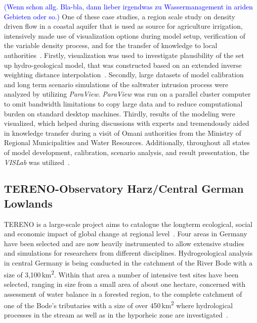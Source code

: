 \documentclass[twocolumn]{svjour3}          %
\newcommand{\myedit}[2]{\textcolor{red}{\st{#1}} \textcolor{blue}{#2}}
\begin{document}
\myedit{}{(Wenn schon allg. Bla-bla, dann lieber irgendwas zu Wassermanagement in ariden Gebieten oder so.)} One of these case studies, a region scale study on density driven flow in a coastal aquifer that is used as source for agriculture irrigation, intensively made use of visualization options during model setup, verification of the variable density process, and for the transfer of knowledge to local authorities~\cite{walther:cam, walther:eesenvirvis}. Firstly, visualization was used to investigate plausibility of the set up hydro-geological model, that was constructed based on an extended inverse weighting distance interpolation~\cite{walther:modelcare}. Secondly, large datasets of model calibration and long term scenario simulations of the saltwater intrusion process were analyzed by utilizing \emph{ParaView}. \emph{ParaView} was run on a parallel cluster computer to omit bandwidth limitations to copy large data and to reduce computational burden on standard desktop machines. Thirdly, results of the modeling were visualized, which helped during discussions with experts and tremendously aided in knowledge transfer during a visit of Omani authorities from the Ministry of Regional Municipalities and Water Resources. Additionally, throughout all states of model development, calibration, scenario analysis, and result presentation, the \emph{VISLab} was utilized~\cite{walther:eesenvirvis}.

\subsection{TERENO-Observatory Harz/Central German Lowlands}\label{tereno-bode}

TERENO is a large-scale project aims to catalogue the longterm ecological, social and economic impact of global change at regional level~\cite{zacharias:tereno}. Four areas in Germany have been selected and are now heavily instrumented to allow extensive studies and simulations for researchers from different disciplines. Hydrogeological analysis in central Germany is being conducted in the catchment of the River Bode with a size of 3,100\,km\textsuperscript{2}. Within that area a number of intensive test sites have been selected, ranging in size from a small area of about one hectare, concerned with assessment of water balance in a forested region, to the complete catchment of one of the Bode's tributaries with a size of over 450\,km\textsuperscript{2} where hydrological processes in the stream as well as in the hyporheic zone are investigated~\cite{schmidt:selke, trauth:flow}.
\end{document}
